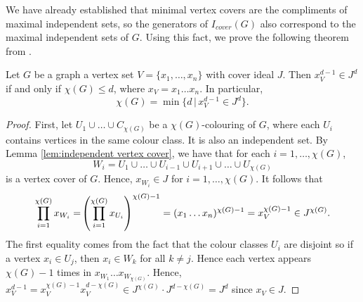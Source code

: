 \documentclass[../main.tex]{subfiles}
\begin{document}
    We have already established that minimal vertex covers are the compliments of maximal independent sets, so the generators of $I_{cover}(G)$ also correspond to the maximal independent sets of $G$. Using this fact, we prove the following theorem from \cite{francisco2011colorings}.

    \begin{theorem} \label{thm:chromatic number}
        Let $G$ be a graph a vertex set $V=\{x_1,\dots,x_n\}$ with cover ideal $J$. Then $x_V^{d-1}\in J^d$ if and only if $\chi(G)\leq d$, where $x_V=x_1\dots x_n$. In particular,
        $$\chi(G)=\min\{d\,|\,x_V^{d-1}\in J^d\}.$$
    \end{theorem}
    \begin{proof}
        First, let $U_1\cup\dots\cup C_{\chi(G)}$ be a $\chi(G)$-colouring of $G$, where each $U_i$ contains vertices in the same colour class. It is also an independent set. By Lemma \ref{lem:independent vertex cover}, we have that for each $i=1,\dots,\chi(G)$, 
        $$W_i=U_1\cup\dots \cup U_{i-1} \cup U_{i+1}\cup\dots\cup U_{\chi(G)}$$
        is a vertex cover of $G$. Hence, $x_{W_i}\in J$ for $i=1,\dots, \chi(G)$. It follows that 
        $$\prod^{\chi(G)}_{i=1}x_{W_i}= \lr(){\prod^{\chi(G)}_{i=1}x_{U_i}}^{\chi(G)-1}=(x_1\dots x_n)^{\chi(G)-1}=x_V^{\chi(G)-1}\in J^{\chi(G)}.$$
        The first equality comes from the fact that the colour classes $U_i$ are disjoint so if a vertex $x_i\in U_j$, then $x_i\in W_k$ for all $k\neq j$. Hence each vertex appears $\chi(G)-1$ times in $x_{W_1}\dots x_{W_{\chi(G)}}$. Hence, $x_V^{d-1} =x_V^{\chi(G)-1}x_V^{d-\chi(G)}\in J^{\chi(G)}\cdot J^{d-\chi(G)} = J^d$ since $x_V\in J$.


\end{proof}
\end{document}
